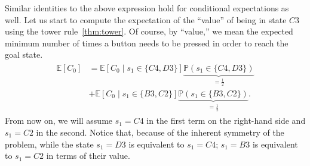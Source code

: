 %
Similar identities to the above expression hold for conditional expectations as
well. Let us start to compute the expectation of the ``value'' of being in state
$C3$ using the tower rule~\ref{thm:tower}. Of course, by ``value,'' we mean the
expected minimum number of times a button needs to be pressed in order to reach
the goal state.
\begin{align}
   \begin{split}
    \mathbb{E}[C_0] &= \mathbb{E}\left[ C_0 \mid s_1 \in \{C4, D3\} \right] 
    \underbrace{\mathbb{P}(s_1 \in \{C4, D3\})}_{=\frac{1}{2}} \\ 
    &+
    \mathbb{E}\left[ C_0 \mid s_1 \in \{B3, C2\} 
    \right] \underbrace{\mathbb{P}(s_1 \in \{B3, C2\})}_{=\frac{1}{2}}.
    \end{split}
    \label{eq:tower1}
\end{align}
%
From now on, we will assume $s_1 = C4$ in the first term on the right-hand side
and $s_1 = C2$ in the second. Notice that, because of the inherent symmetry of
the problem, while the state $s_1 = D3$ is equivalent to $s_1 = C4$; $s_1 =
B3$ is equivalent to $s_1 = C2$ in terms of their value.

